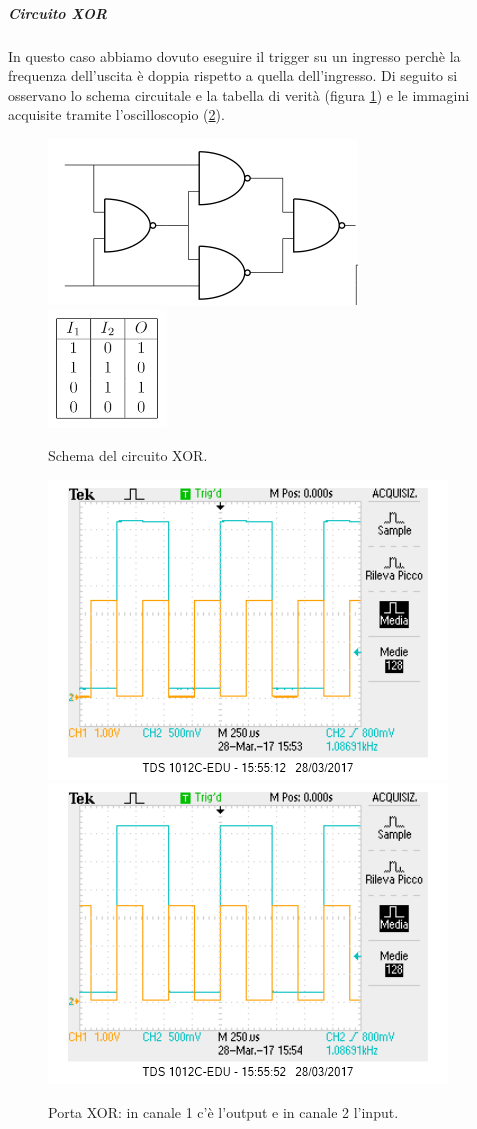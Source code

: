 \documentclass[10pt,a4paper]{article}
\begin{document}
\subparagraph{Circuito XOR}
In questo caso abbiamo dovuto eseguire il trigger su un ingresso perchè la frequenza dell'uscita è doppia rispetto a quella dell'ingresso. Di seguito si osservano lo schema circuitale e la tabella di verità (figura \ref{fig:XOR}) e le immagini acquisite tramite l'oscilloscopio (\ref{osc:XOR}).


\begin{figure}[!htb]
  \centering
  \includegraphics[scale=0.7]{xor.png}\includegraphics[scale=0.9]{tabXOR.png}
\caption{Schema del circuito XOR.\label{fig:XOR}}
\end{figure}

\begin{figure}[!htb]
  \centering
  \includegraphics[scale=0.75]{xor1.png}\includegraphics[scale=0.75]{xor2.png}
\caption{Porta XOR: in canale 1 c'è l'output e in canale 2 l'input.\label{osc:XOR}}
\end{figure}
\end{document}
